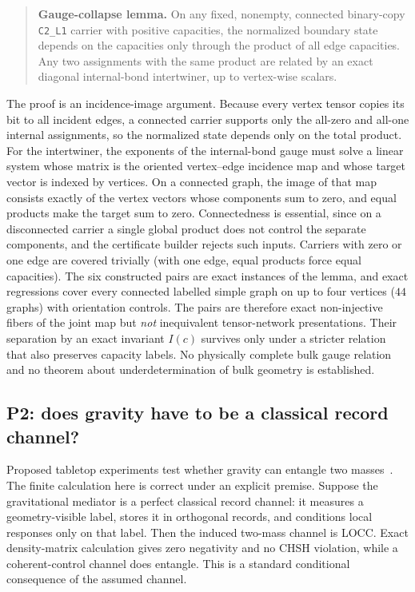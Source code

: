 \documentclass[11pt]{article}
\theoremstyle{definition}
\begin{document}
\begin{quote}
\textbf{Gauge-collapse lemma.} On any fixed, nonempty, connected binary-copy \texttt{C2\_L1} carrier with positive
capacities, the normalized boundary state depends on the capacities only through the product of all edge capacities.
Any two assignments with the same product are related by an exact diagonal internal-bond intertwiner, up to
vertex-wise scalars.
\end{quote}

The proof is an incidence-image argument. Because every vertex tensor copies its bit to all incident edges, a
connected carrier supports only the all-zero and all-one internal assignments, so the normalized state depends only on
the total product. For the intertwiner, the exponents of the internal-bond gauge must solve a linear system whose matrix is
the oriented vertex--edge incidence map and whose target vector is indexed by vertices. On a connected graph, the image
of that map consists exactly of the vertex vectors whose components sum to zero, and equal products make the target sum
to zero. Connectedness is essential, since on a
disconnected carrier a single global product does not control the separate components, and the certificate builder
rejects such inputs. Carriers with zero or one edge are covered trivially (with one edge, equal products force equal
capacities). The six constructed pairs are exact instances of the lemma, and exact regressions cover every connected
labelled simple graph on up to four vertices (\(44\) graphs) with orientation controls. The pairs are therefore exact
non-injective fibers of the joint map but \emph{not} inequivalent tensor-network presentations. Their separation by an
exact invariant \(I(c)\) survives only under a stricter relation that also preserves capacity labels. No physically
complete bulk gauge relation and no theorem about underdetermination of bulk geometry is established.

\subsection{P2: does gravity have to be a classical record channel?}\label{bmv-conditional-statement}

Proposed tabletop experiments test whether gravity can entangle two masses~\citep{Bose2017,MarlettoVedral2017}. The
finite calculation here is correct under an explicit premise. Suppose the gravitational mediator is a perfect classical
record channel: it measures a geometry-visible label, stores it in orthogonal records, and conditions local responses
only on that label. Then the induced two-mass channel is LOCC. Exact density-matrix calculation gives zero negativity
and no CHSH violation, while a coherent-control channel does entangle. This is a standard conditional consequence of the
assumed channel.
\end{document}
